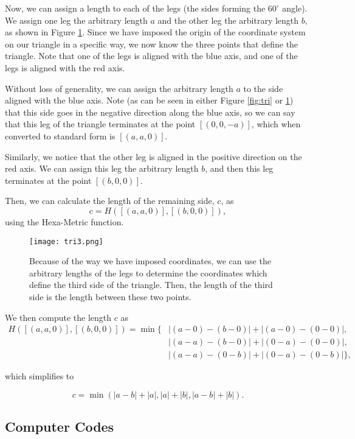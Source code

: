\documentclass[11pt]{article}
\theoremstyle{definition}
\theoremstyle{plain}
\theoremstyle{remark}
\begin{document}
	Now, we can assign a length to each of the legs (the sides forming the
	\(60^{\circ}\) angle). We assign one leg the arbitrary length \(a\) and the
	other leg the arbitrary length \(b\), as shown in Figure \ref{fig:tri_c}.
	Since we have imposed the origin of the coordinate system on our triangle
	in a specific way, we now know the three points that define the triangle.
	Note that one of the legs is aligned with the blue axis, and one of the
	legs is aligned with the red axis.

	Without loss of generality, we can assign the arbitrary length \(a\) to the
	side aligned with the blue axis. Note (as can be seen in either Figure
	\ref{fig:tri} or \ref{fig:tri_c}) that this side goes in the negative
	direction along the blue axis, so we can say that this leg of the triangle
	terminates at the point \([(0,0,-a)]\), which when converted to standard
	form is \([(a,a,0)]\).

	Similarly, we notice that the other leg is aligned in the positive
	direction on the red axis. We can assign this leg the arbitrary length
	\(b\), and then this leg terminates at the point \([(b,0,0)]\).

	Then, we can calculate the length of the remaining side, \(c\), as
	\[c = H([(a,a,0)], [(b,0,0)]),\]
	using the Hexa-Metric function.

	\begin{figure}[htbp]
		\centering
		\texttt{[image: tri3.png]}
		\caption{Because of the way we have imposed coordinates, we can use the
		arbitrary lengths of the legs to determine the coordinates which define
		the third side of the triangle. Then, the length of the third side is
		the length between these two points.}
		\label{fig:tri_c}
	\end{figure}

	We then compute the length \(c\) as
	\begin{align*}
		H([(a,a,0)], [(b,0,0)]) = \min{}\{ &|(a - 0) - (b - 0)| + |(a - 0) - (0
		- 0)|, \\
		&|(a - a) - (b - 0)| + |(0 - a) - (0 - 0)|, \\
		&|(a - a) - (0 - b)| + |(0 - a) - (0 - b)| \},
	\end{align*}

	which simplifies to

	\[c = \min{ (\left| a-b\right| +\left| a\right| ,\left| a\right| +\left|
	b\right| ,\left| a-b\right| +\left|
		b\right| )}.\]

	\subsection{Computer Codes}
\end{document}
